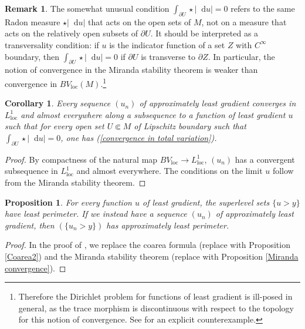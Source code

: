 \documentclass[reqno,10pt]{amsart}
\newcommand*\dif{\mathop{}\!\mathrm{d}}
\newcommand{\loc}{\mathrm{loc}}
\newtheorem{proposition}[theorem]{Proposition}
\newtheorem{corollary}[theorem]{Corollary}
\theoremstyle{definition}
\newtheorem{remark}[theorem]{Remark}
\numberwithin{equation}{section}
\begin{document}
\begin{remark}\label{transversality}
The somewhat unusual condition $\int_{\partial U} \star |\dif u| = 0$ refers to the same Radon measure $\star |\dif u|$ that acts on the open sets of $M$, not on a measure that acts on the relatively open subsets of $\partial U$.
It should be interpreted as a transversality condition: if $u$ is the indicator function of a set $Z$ with $C^\infty$ boundary, then $\int_{\partial U} \star |\dif u| = 0$ if $\partial U$ is transverse to $\partial Z$.
In particular, the notion of convergence in the Miranda stability theorem is weaker than convergence in $BV_\loc(M)$.\footnote{Therefore the Dirichlet problem for functions of least gradient is ill-posed in general, as the trace morphism is discontinuous with respect to the topology for this notion of convergence. See \cite{spradlin2013traces} for an explicit counterexample.}
\end{remark}

\begin{corollary}\label{compactness}
Every sequence $(u_n)$ of approximately least gradient converges in $L^1_\loc$ and almost everywhere along a subsequence to a function of least gradient $u$ such that for every open set $U \Subset M$ of Lipschitz boundary such that $\int_{\partial U} \star |\dif u| = 0$, one has (\ref{convergence in total variation}).
\end{corollary}
\begin{proof}
By compactness of the natural map $BV_\loc \to L^1_\loc$, $(u_n)$ has a convergent subsequence in $L^1_\loc$ and almost everywhere.
The conditions on the limit $u$ follow from the Miranda stability theorem.
\end{proof}

\begin{proposition}\label{level sets are minimal}
For every function $u$ of least gradient, the superlevel sets $\{u > y\}$ have least perimeter.
If we instead have a sequence $(u_n)$ of approximately least gradient, then $(\{u_n > y\})$ has approximately least perimeter.
\end{proposition}
\begin{proof}
In the proof of \cite[Theorem 1]{BOMBIERI1969}, we replace the coarea formula (replace \cite[Theorem 1.6]{Miranda66} with Proposition \ref{Coarea2}) and the Miranda stability theorem (replace \cite[Teorema 3]{Miranda67} with Proposition \ref{Miranda convergence}).
\end{proof}

\end{document}
